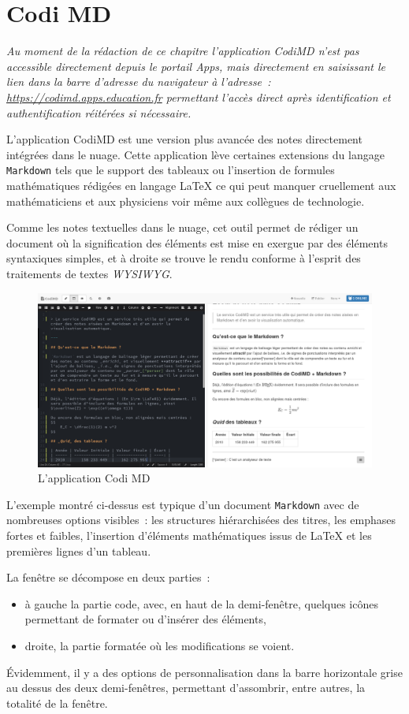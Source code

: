 \chapter{Codi MD} \label{chap-codimd}

\emph{
	Au moment de la rédaction de ce chapitre l'application CodiMD n'est pas accessible directement depuis le portail Apps, mais directement en saisissant le lien dans la barre d'adresse du navigateur à l'adresse~: \newline \url{https://codimd.apps.education.fr} permettant l'accès direct après identification et authentification réitérées si nécessaire.
}

L'application CodiMD est une version plus avancée des notes directement intégrées dans le nuage. 
Cette application lève certaines extensions du langage \texttt{Markdown} tels que le support des tableaux ou l'insertion de formules mathématiques rédigées en langage \LaTeX{} ce qui peut manquer cruellement aux mathématiciens et aux physiciens voir même aux collègues de technologie.

Comme les notes textuelles dans le nuage, cet outil permet de rédiger un document où la signification des éléments est mise en exergue par des éléments syntaxiques simples, et à droite se trouve le rendu conforme à l'esprit des traitements de textes \emph{WYSIWYG\/}.
\begin{figure}
	\centering
	\includegraphics[width=\linewidth]{./Captures/codimd.exemple.png}
	\caption{L'application Codi MD}
\end{figure}

L'exemple montré ci-dessus est typique d'un document \texttt{Markdown} avec de nombreuses options visibles~: les structures hiérarchisées des titres, les emphases fortes et faibles, l'insertion d'éléments mathématiques issus de \LaTeX{} et les premières lignes d'un tableau.

La fenêtre se décompose en deux parties~:
\begin{itemize}
	\item à gauche la partie code, avec, en haut de la demi-fenêtre, quelques icônes permettant de formater ou d'insérer des éléments,
	\item droite, la partie formatée où les modifications se voient.
\end{itemize}

Évidemment, il y a des options de personnalisation dans la barre horizontale grise au dessus des deux demi-fenêtres, permettant d'assombrir, entre autres, la totalité de la fenêtre.